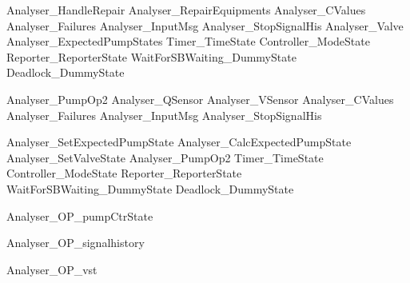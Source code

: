 \documentclass{article}
\begin{document}
\begin{zed}
	Analyser\_HandleRepair  Analyser\_RepairEquipments \land \Xi Analyser\_CValues \land \Xi Analyser\_Failures \land \Xi Analyser\_InputMsg \land \Xi Analyser\_StopSignalHis \land \Xi Analyser\_Valve \land \Xi Analyser\_ExpectedPumpStates \land \Xi Timer\_TimeState \land \Xi Controller\_ModeState \land \Xi Reporter\_ReporterState \land \Xi WaitForSBWaiting\_DummyState \land \Xi Deadlock\_DummyState
\end{zed}

\begin{zed}
	Analyser\_PumpOp2  \Xi Analyser\_QSensor \land \Xi Analyser\_VSensor \land \Xi Analyser\_CValues \land \Xi Analyser\_Failures \land \Xi Analyser\_InputMsg \land \Xi Analyser\_StopSignalHis
\end{zed}

\begin{zed}
	Analyser\_SetExpectedPumpState  Analyser\_CalcExpectedPumpState \land Analyser\_SetValveState \land Analyser\_PumpOp2 \land \Xi Timer\_TimeState \land \Xi Controller\_ModeState \land \Xi Reporter\_ReporterState \land \Xi WaitForSBWaiting\_DummyState \land \Xi Deadlock\_DummyState
\end{zed}

\begin{zed}
	Analyser\_OP\_pumpCtrState 
\end{zed}

\begin{zed}
	Analyser\_OP\_signalhistory 
\end{zed}

\begin{zed}
	Analyser\_OP\_vst 
\end{zed}
\end{document}
